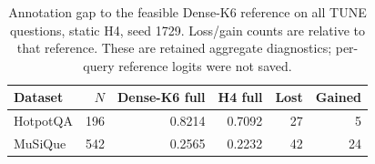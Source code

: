 \begin{table}[t]
\centering\small
\caption{Annotation gap to the feasible Dense-K6 reference on all TUNE questions, static H4, seed 1729. Loss/gain counts are relative to that reference. These are retained aggregate diagnostics; per-query reference logits were not saved.}\label{tab:reference}
\begin{tabular}{lrrrrr}\toprule
Dataset & $N$ & Dense-K6 full & H4 full & Lost & Gained \\
\midrule
HotpotQA & 196 & 0.8214 & 0.7092 & 27 & 5 \\
MuSiQue & 542 & 0.2565 & 0.2232 & 42 & 24 \\
\bottomrule\end{tabular}
\end{table}
